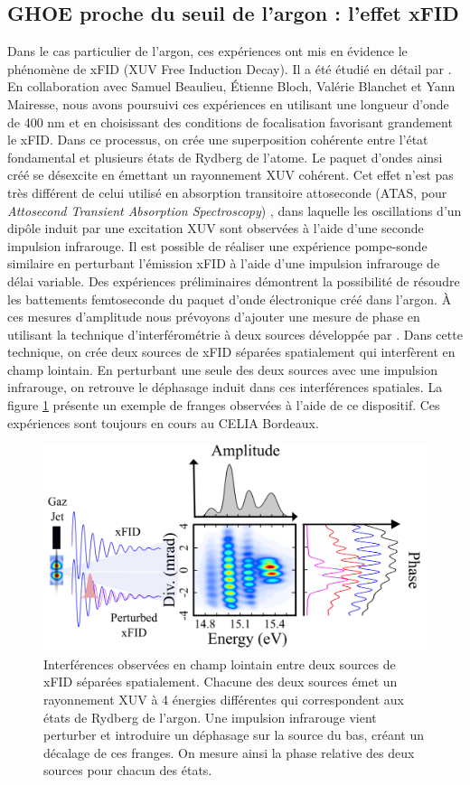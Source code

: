 \subsection{GHOE proche du seuil de l'argon : l'effet xFID}
Dans le cas particulier de l'argon, ces expériences ont mis en évidence le phénomène de xFID (XUV Free Induction Decay). Il a été étudié en détail par . En collaboration avec Samuel Beaulieu, \'{E}tienne Bloch, Valérie Blanchet et Yann Mairesse, nous avons poursuivi ces expériences en utilisant une longueur d'onde de 400 nm et en choisissant des conditions de focalisation favorisant grandement le xFID. Dans ce processus, on crée une superposition cohérente entre l'état fondamental et plusieurs états de Rydberg de l'atome. Le paquet d'ondes ainsi créé se désexcite en émettant un rayonnement XUV cohérent. Cet effet n'est pas très différent de celui utilisé en absorption transitoire attoseconde (ATAS, pour \textit{Attosecond Transient Absorption Spectroscopy}) , dans laquelle les oscillations d'un dipôle induit par une excitation XUV sont observées à l'aide d'une seconde impulsion infrarouge. Il est possible de réaliser une expérience pompe-sonde similaire en perturbant l'émission xFID à l'aide d'une impulsion infrarouge de délai variable. Des expériences préliminaires démontrent la possibilité de résoudre les battements femtoseconde du paquet d'onde électronique créé dans l'argon. \`A ces mesures d'amplitude nous prévoyons d'ajouter une mesure de phase en utilisant la technique d'interférométrie à deux sources développée par . Dans cette technique, on crée deux sources de xFID séparées spatialement qui interfèrent en champ lointain. En perturbant une seule des deux sources avec une impulsion infrarouge, on retrouve le déphasage induit dans ces interférences spatiales. La figure \ref{fig:xfid_deuxsources} présente un exemple de franges observées à l'aide de ce dispositif. Ces expériences sont toujours en cours au CELIA Bordeaux. 

\begin{figure}[!ht]
\centering
\includegraphics[width=.8\columnwidth]{Figures/Conclusion/xfid_deuxsources.png}%
\caption{Interférences observées en champ lointain entre deux sources de xFID séparées spatialement. Chacune des deux sources émet un rayonnement XUV à 4 énergies différentes qui correspondent aux états de Rydberg de l'argon. Une impulsion infrarouge vient perturber et introduire un déphasage sur la source du bas, créant un décalage de ces franges. On mesure ainsi la phase relative des deux sources pour chacun des états.}
\label{fig:xfid_deuxsources}
\end{figure}

